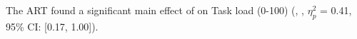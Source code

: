 The ART found a significant main effect of \Phase on Task load (0-100) (, , $\eta_{p}^{2}$ = 0.41, 95\% CI: [0.17, 1.00]). 
